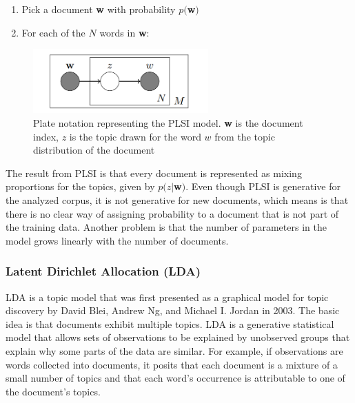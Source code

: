 \documentclass[12pt]{report}
\begin{document}
\begin{enumerate}
\item Pick a document \textbf{w} with probability $p($\textbf{w}$)$
\item For each of the $N$ words in \textbf{w}:
\end{enumerate}
\begin{center}
\begin{figure}[h]
\centering
\includegraphics[width=0.6\textwidth]{figs/PLSI_plate_notation.png}
\caption{Plate notation representing the PLSI model. \textbf{w} is the document 
index, $z$ is the topic drawn for the word $w$ from the topic distribution of 
the document}
\end{figure}
\end{center}
The result from PLSI is that every document is represented as mixing proportions
for the topics, given by $p(z|$\textbf{w}$)$. Even though PLSI is generative for 
the analyzed corpus, it is not generative for new documents, which means is that
there is no clear way of assigning probability to a document that is not part
of the training data\cite{blei2003latent}. Another problem is that the number 
of parameters in the model grows linearly with the number of documents.


\subsubsection{Latent Dirichlet Allocation (LDA)}
\label{LDAexplained}
LDA is a topic model that was first presented as a graphical model for topic
discovery by David Blei, Andrew Ng, and Michael I. Jordan in 2003. The basic
idea is that documents exhibit multiple topics. LDA is a generative statistical
model that allows sets of observations to be explained by unobserved groups
that explain why some parts of the data are similar. For example, if
observations are words collected into documents, it posits that each document
is a mixture of a small number of topics and that each word's occurrence is
attributable to one of the document's topics\cite{Blei11introductionto}.
\end{document}
